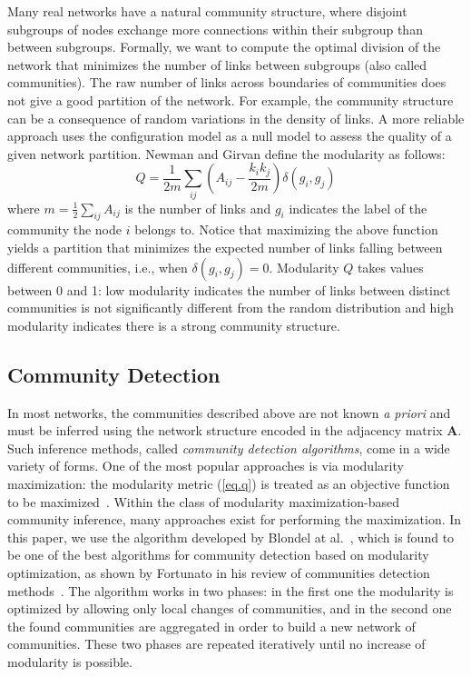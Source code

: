 \documentclass[12pt]{article}
\begin{document}
Many real networks have a natural community structure, where disjoint subgroups of nodes exchange more connections within their subgroup than between subgroups. Formally, we want to compute the optimal division of the network that minimizes the number of links between subgroups (also called  communities). The raw number of links across boundaries of communities does not give a good partition of the  network. For example, the community structure can be a consequence of random variations in the density of links. A more reliable approach uses the configuration model \cite{newman2001random} as a null model to assess the quality of a given network partition. Newman and Girvan \cite{newman2004finding} define the modularity as follows:
\begin{equation}
Q = \frac{1}{2m} \sum_{ij} \left( A_{ij} -
\frac{k_i k_j}{2m} \right) \delta(g_i,g_j)
\label{eq.q}
\end{equation}
where $m = \frac{1}{2} \sum_{ij} A_{ij}$ is the number of links and $g_i$
indicates the label of the community the node $i$
belongs to. Notice that maximizing the above function yields a partition that minimizes the 
expected number of links falling between different communities, i.e., when 
$\delta(g_i, g_j) = 0$. 
Modularity $Q$ takes values between 0 and 1: low modularity indicates the number of links 
between distinct communities is not significantly different from the random distribution and high 
modularity indicates there is a strong community structure.

\subsection{Community Detection}

In most networks, the communities described above are not known \emph{a priori} and must be inferred using the network structure encoded in the adjacency matrix $\textbf{A}$. Such inference methods, called \emph{community detection algorithms}, come in a wide variety of forms. One of the most popular approaches is via modularity maximization: the modularity metric (\ref{eq.q}) is treated as an objective function to be maximized~\cite{newman2004finding}. Within the class of modularity maximization-based community inference, many approaches exist for performing the maximization. In this paper, we use the algorithm developed by Blondel at al\@.~\cite{blondel2008fast}, which is found to be one of the best algorithms for community detection based on modularity 
optimization, as shown by Fortunato in his review of communities detection methods~\cite{fortunato2010community}. 
The algorithm works in two phases: in the first one the modularity is optimized by allowing only local changes of communities, 
and in the second one the found communities are aggregated in order to build a new network of communities. 
These two phases are repeated iteratively until no increase of modularity is possible.
\end{document}

